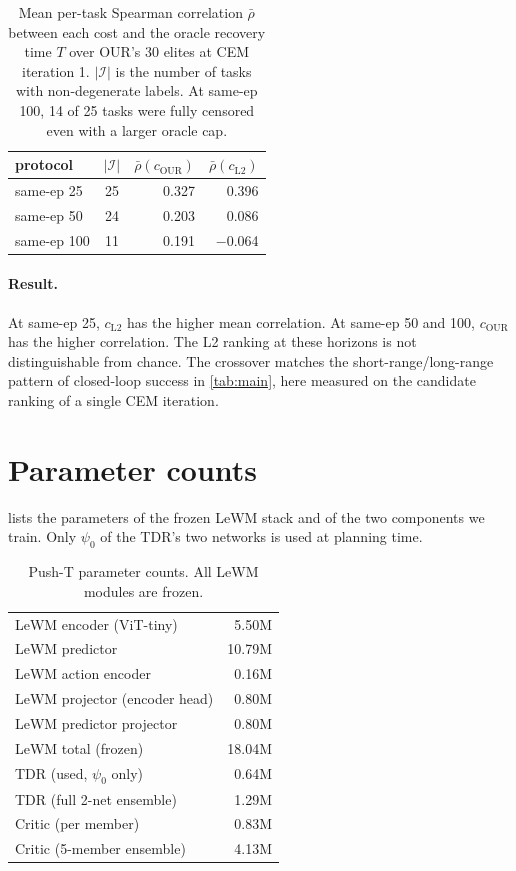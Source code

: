 \documentclass{article} %
\theoremstyle{definition}
\theoremstyle{remark}
\begin{document}
\begin{table}[h]
\centering\small
\caption{Mean per-task Spearman correlation $\bar\rho$ between each cost and the oracle recovery
time $T$ over OUR's 30 elites at CEM iteration 1. $|\mathcal{I}|$ is the number of tasks with
non-degenerate labels. At same-ep 100, 14 of 25 tasks were fully censored even with a larger
oracle cap.}
\label{tab:cem-trace-rho}
\begin{tabular}{lcrr}
\toprule
protocol & $|\mathcal{I}|$ & $\bar\rho(c_{\mathrm{OUR}})$ & $\bar\rho(c_{\mathrm{L2}})$ \\
\midrule
same-ep 25  & 25 & 0.327  & 0.396 \\
same-ep 50  & 24 & 0.203  & 0.086 \\
same-ep 100 & 11 & 0.191  & $-$0.064 \\
\bottomrule
\end{tabular}
\end{table}

\paragraph{Result.} At same-ep 25, $c_{\mathrm{L2}}$ has the higher mean correlation. At same-ep 50 and 100, $c_{\mathrm{OUR}}$ has the
higher correlation. The L2 ranking at these horizons is not distinguishable
from chance. The crossover matches the short-range/long-range pattern of closed-loop success in
\cref{tab:main}, here measured on the candidate ranking of a single CEM iteration.

\section{Parameter counts}
\label{app:params}
 lists the parameters of the frozen LeWM stack and of the two components we
train. Only $\psi_0$ of the TDR's two networks is used at planning time.

\begin{table}[h]
\centering\small
\caption{Push-T parameter counts. All LeWM modules are frozen. }
\label{tab:params}
\begin{tabular}{lr}
\toprule
LeWM encoder (ViT-tiny) & 5.50M \\
LeWM predictor & 10.79M \\
LeWM action encoder & 0.16M \\
LeWM projector (encoder head) & 0.80M \\
LeWM predictor projector & 0.80M \\
\quad LeWM total (frozen) & 18.04M \\
\midrule
TDR (used, $\psi_0$ only) & 0.64M \\
TDR (full 2-net ensemble) & 1.29M \\
Critic (per member) & 0.83M \\
Critic (5-member ensemble) & 4.13M \\
\bottomrule
\end{tabular}
\end{table}
\end{document}
